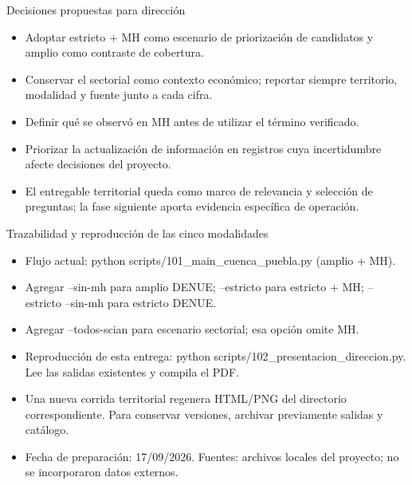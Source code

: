 \documentclass[aspectratio=169,10pt]{beamer}
\begin{document}
\begin{frame}{Decisiones propuestas para dirección}
\small
\begin{itemize}
\item Adoptar estricto + MH como escenario de priorización de candidatos y amplio como contraste de cobertura.
\item Conservar el sectorial como contexto económico; reportar siempre territorio, modalidad y fuente junto a cada cifra.
\item Definir qué se observó en MH antes de utilizar el término verificado.
\item Priorizar la actualización de información en registros cuya incertidumbre afecte decisiones del proyecto.
\item El entregable territorial queda como marco de relevancia y selección de preguntas; la fase siguiente aporta evidencia específica de operación.
\end{itemize}
\end{frame}
\begin{frame}{Trazabilidad y reproducción de las cinco modalidades}
\small
\begin{itemize}
\item Flujo actual: python scripts/101\_main\_cuenca\_puebla.py (amplio + MH).
\item Agregar --sin-mh para amplio DENUE; --estricto para estricto + MH; --estricto --sin-mh para estricto DENUE.
\item Agregar --todos-scian para escenario sectorial; esa opción omite MH.
\item Reproducción de esta entrega: python scripts/102\_presentacion\_direccion.py. Lee las salidas existentes y compila el PDF.
\item Una nueva corrida territorial regenera HTML/PNG del directorio correspondiente. Para conservar versiones, archivar previamente salidas y catálogo.
\item Fecha de preparación: 17/09/2026. Fuentes: archivos locales del proyecto; no se incorporaron datos externos.
\end{itemize}
\end{frame}
\end{document}
